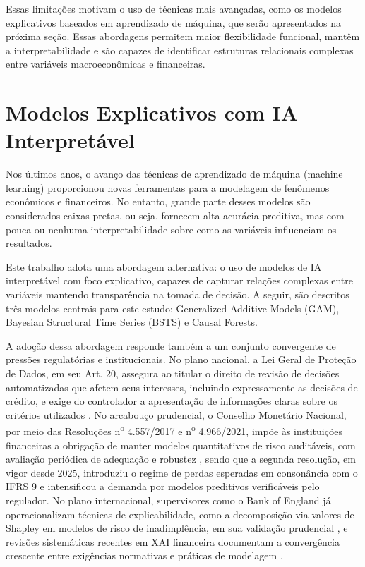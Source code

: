 \documentclass[	12pt, Times, openright, oneside, a4paper, english, brazil]{abntex2}
\begin{document}
Essas limitações motivam o uso de técnicas mais avançadas, como os modelos explicativos baseados em aprendizado de máquina, que serão apresentados na próxima seção. Essas abordagens permitem maior flexibilidade funcional, mantêm a interpretabilidade e são capazes de identificar estruturas relacionais complexas entre variáveis macroeconômicas e financeiras.


\chapter{Modelos Explicativos com IA Interpretável}

Nos últimos anos, o avanço das técnicas de aprendizado de máquina (machine learning) proporcionou novas ferramentas para a modelagem de fenômenos econômicos e financeiros. No entanto, grande parte desses modelos são considerados caixas-pretas, ou seja, fornecem alta acurácia preditiva, mas com pouca ou nenhuma interpretabilidade sobre como as variáveis influenciam os resultados.

Este trabalho adota uma abordagem alternativa: o uso de modelos de IA interpretável com foco explicativo, capazes de capturar relações complexas entre variáveis mantendo transparência na tomada de decisão. A seguir, são descritos três modelos centrais para este estudo: Generalized Additive Models (GAM), Bayesian Structural Time Series (BSTS) e Causal Forests.

A adoção dessa abordagem responde também a um conjunto convergente de pressões regulatórias e institucionais. No plano nacional, a Lei Geral de Proteção de Dados, em seu Art. 20, assegura ao titular o direito de revisão de decisões automatizadas que afetem seus interesses, incluindo expressamente as decisões de crédito, e exige do controlador a apresentação de informações claras sobre os critérios utilizados \cite{brasil2018lgpd}. No arcabouço prudencial, o Conselho Monetário Nacional, por meio das Resoluções n\textsuperscript{o} 4.557/2017 e n\textsuperscript{o} 4.966/2021, impõe às instituições financeiras a obrigação de manter modelos quantitativos de risco auditáveis, com avaliação periódica de adequação e robustez \cite{bcb2017res4557, bcb2021res4966}, sendo que a segunda resolução, em vigor desde 2025, introduziu o regime de perdas esperadas em consonância com o IFRS 9 e intensificou a demanda por modelos preditivos verificáveis pelo regulador. No plano internacional, supervisores como o Bank of England já operacionalizam técnicas de explicabilidade, como a decomposição via valores de Shapley em modelos de risco de inadimplência, em sua validação prudencial \cite{bracke2019boe}, e revisões sistemáticas recentes em XAI financeira documentam a convergência crescente entre exigências normativas e práticas de modelagem \cite{cerneviciene2024xai}.
\end{document}
